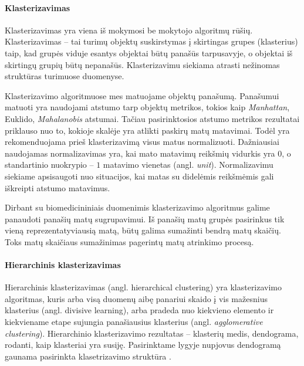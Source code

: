 

\paragraph{Klasterizavimas}

Klasterizavimas yra viena iš mokymosi be mokytojo algoritmų rūšių. Klasterizavimas -- tai turimų objektų suskirstymas į skirtingas grupes (klasterius) taip, kad grupės viduje esantys objektai būtų panašūs tarpusavyje, o objektai iš skirtingų grupių būtų nepanašūs. Klasterizavimu siekiama atrasti nežinomas struktūras turimuose duomenyse. 

Klasterizavimo algoritmuose mes matuojame objektų panašumą. Panašumui matuoti yra naudojami atstumo tarp objektų metrikos, tokios kaip \textit{Manhattan}, Euklido, \textit{Mahalanobis} atstumai. Tačiau pasirinktosios atstumo metrikos rezultatai priklauso nuo to, kokioje skalėje yra atlikti paskirų matų matavimai. Todėl yra rekomenduojama prieš klasterizavimą visus matus normalizuoti. Dažniausiai naudojamas normalizavimas yra, kai mato matavimų reikšmių vidurkis yra $0$, o standartinio nuokrypio -- $1$ matavimo vienetas (angl. \textit{unit}). Normalizavimu siekiame apsisaugoti nuo situacijos, kai matas su didelėmis reikšmėmis gali iškreipti atstumo matavimus. 

Dirbant su biomedicininiais duomenimis klasterizavimo algoritmus galime panaudoti panašių matų sugrupavimui. Iš panašių matų grupės pasirinkus tik vieną reprezentatyviausią matą, būtų galima sumažinti bendrą matų skaičių. Toks matų skaičiaus sumažinimas pagerintų matų atrinkimo procesą.

\paragraph{Hierarchinis klasterizavimas}

Hierarchinis klasterizavimas (angl. hierarchical clustering) yra klasterizavimo algoritmas, kuris arba visą duomenų aibę panariui skaido į vis mažesnius klasterius (angl. divisive learning), arba pradeda nuo kiekvieno elemento ir kiekviename etape sujungia panašiausius klasterius (angl. \textit{agglomerative clustering}).  Hierarchinio klasterizavimo rezultatas -- klasterių medis, dendograma, rodanti, kaip klasteriai yra susiję. Pasirinktame lygyje nupjovus dendogramą gaunama pasirinkta klasetrizavimo struktūra \cite{martisiute08}. 

